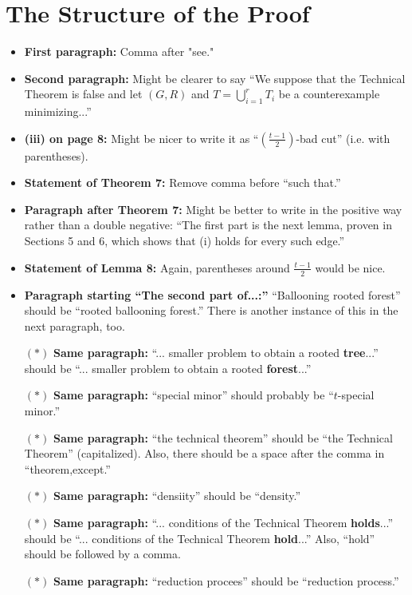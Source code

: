\documentclass[11 pt]{article}
\theoremstyle{definition}
\theoremstyle{case}
\numberwithin{equation}{section}
\begin{document}
\section{The Structure of the Proof}

\begin{itemize}
\item\textbf{First paragraph:} Comma after "see."
\item \textbf{Second paragraph:} Might be clearer to say ``We suppose that the Technical Theorem is false and let $(G,R)$ and $T=\bigcup_{i=1}^rT_i$ be a counterexample minimizing...''
\item \textbf{(iii) on page 8:} Might be nicer to write it as ``$\left(\frac{t-1}{2}\right)$-bad cut'' (i.e. with parentheses). 
\item \textbf{Statement of Theorem 7:} Remove comma before ``such that.''
\item \textbf{Paragraph after Theorem 7:} Might be better to write in the positive way rather than a double negative: ``The first part is the next lemma, proven in Sections 5 and 6, which shows that (i) holds for every such edge.''
\item \textbf{Statement of Lemma 8:} Again, parentheses around $\frac{t-1}{2}$ would be nice. 
\item \textbf{Paragraph starting ``The second part of...:''} ``Ballooning rooted forest'' should be ``rooted ballooning forest.'' There is another instance of this in the next paragraph, too.
\item[$\boldsymbol{(*)}$] \textbf{Same paragraph:} ``... smaller problem to obtain a rooted \textbf{tree}...'' should be  ``... smaller problem to obtain a rooted \textbf{forest}...''
\item[$\boldsymbol{(*)}$] \textbf{Same paragraph:} ``special minor'' should probably be ``$t$-special minor.''
\item[$\boldsymbol{(*)}$] \textbf{Same paragraph:} ``the technical theorem'' should be  ``the Technical Theorem'' (capitalized). Also, there should be a space after the comma in ``theorem,except.''
\item[$\boldsymbol{(*)}$] \textbf{Same paragraph:} ``densiity'' should be ``density.''
\item[$\boldsymbol{(*)}$] \textbf{Same paragraph:} ``... conditions of the Technical Theorem \textbf{holds}...'' should be ``... conditions of the Technical Theorem \textbf{hold}...'' Also, ``hold'' should be followed by a comma.
\item[$\boldsymbol{(*)}$] \textbf{Same paragraph:} ``reduction procees'' should be ``reduction process.''

\end{itemize}
\end{document}
